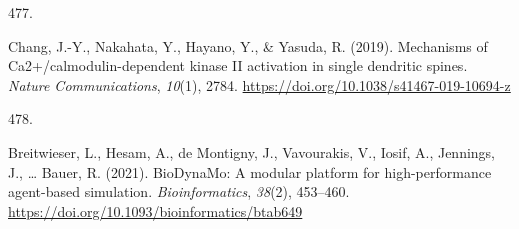 \documentclass[
  11pt,
  letterpaper,
]{scrreprt}
\newlength{\cslhangindent}
\newlength{\csllabelwidth}
\newenvironment{CSLReferences}[2] %
 {\begin{list}{}{%
  \setlength{\itemindent}{0pt}
  \setlength{\leftmargin}{0pt}
  \setlength{\parsep}{0pt}
  \ifodd #1
   \setlength{\leftmargin}{\cslhangindent}
   \setlength{\itemindent}{-1\cslhangindent}
  \fi
  \setlength{\itemsep}{#2\baselineskip}}}
 {\end{list}}
\newcommand{\CSLLeftMargin}[1]{\parbox[t]{\csllabelwidth}{\strut#1\strut}}
\newcommand{\CSLRightInline}[1]{\parbox[t]{\linewidth - \csllabelwidth}{\strut#1\strut}}
\begin{document}
\begin{CSLReferences}{0}{0}
\CSLLeftMargin{477. }%
\CSLRightInline{Chang, J.-Y., Nakahata, Y., Hayano, Y., \& Yasuda, R.
(2019). Mechanisms of {Ca2}+/calmodulin-dependent kinase {II} activation
in single dendritic spines. \emph{Nature Communications}, \emph{10}(1),
2784. \url{https://doi.org/10.1038/s41467-019-10694-z}}

\CSLLeftMargin{478. }%
\CSLRightInline{Breitwieser, L., Hesam, A., de Montigny, J., Vavourakis,
V., Iosif, A., Jennings, J., \ldots{} Bauer, R. (2021). {BioDynaMo}: A
modular platform for high-performance agent-based simulation.
\emph{Bioinformatics}, \emph{38}(2), 453--460.
\url{https://doi.org/10.1093/bioinformatics/btab649}}

\end{CSLReferences}



\printindex
\end{document}
